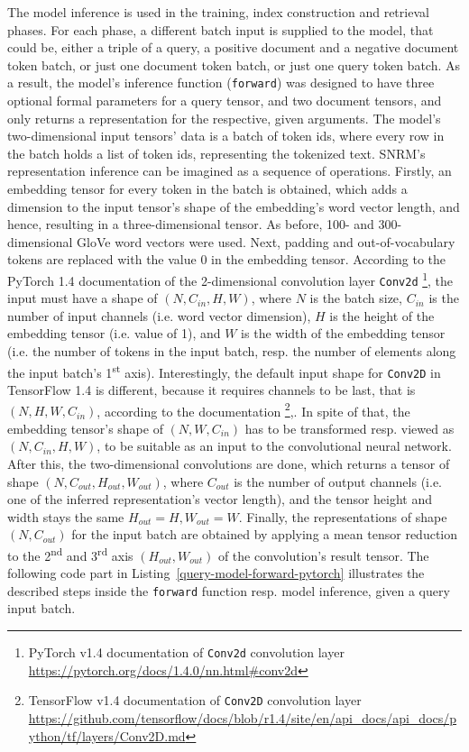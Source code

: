 The model inference is used in the training, index construction and retrieval phases.
For each phase, a different batch input is supplied to the model, that could be,
    either a triple of a query, a positive document and a negative document token batch,
    or just one document token batch, or just one query token batch.
As a result, the model's inference function (\texttt{forward}) was designed to have three optional formal parameters for
    a query tensor, and two document tensors, and only returns a representation for
    the respective, given arguments.
The model's two-dimensional input tensors' data is a batch of token ids, where every row in the batch 
    holds a list of token ids, representing the tokenized text.
SNRM's representation inference can be imagined as a sequence of operations.
Firstly, an embedding tensor for every token in the batch is obtained, which adds a dimension
    to the input tensor's shape of the embedding's word vector length, and hence, resulting 
    in a three-dimensional tensor.
As before, 100- and 300- dimensional GloVe word vectors were used.
Next, padding and out-of-vocabulary tokens are replaced with the value 0 in the embedding tensor.
According to the PyTorch 1.4 documentation of the 2-dimensional convolution layer \texttt{Conv2d}
    \footnote{PyTorch v1.4 documentation of \texttt{Conv2d} convolution layer \url{https://pytorch.org/docs/1.4.0/nn.html\#conv2d}},
    the input must have a shape of $(N, C_{in}, H, W)$, 
    where $N$ is the batch size,
    $C_{in}$ is the number of input channels (i.e. word vector dimension),
    $H$ is the height of the embedding tensor (i.e. value of 1), and 
    $W$ is the width of the embedding tensor (i.e. the number of tokens in the input batch, 
    resp. the number of elements along the input batch's 1\textsuperscript{st} axis).
Interestingly, the default input shape for \texttt{Conv2D} in TensorFlow 1.4 is different,
    because it requires channels to be last, that is $(N, H, W, C_{in})$,
    according to the documentation
    \footnote{TensorFlow v1.4 documentation of \texttt{Conv2D} convolution layer \url{https://github.com/tensorflow/docs/blob/r1.4/site/en/api_docs/api_docs/python/tf/layers/Conv2D.md}},.
In spite of that, the embedding tensor's shape of $(N, W, C_{in})$ has to be transformed resp. 
    viewed as $(N, C_{in}, H, W)$, to be suitable as an input to the convolutional neural network.
After this, the two-dimensional convolutions are done, which returns a tensor of shape 
    $(N, C_{out}, H_{out}, W_{out})$, where 
    $C_{out}$ is the number of output channels (i.e. one of the inferred representation's vector length),
    and the tensor height and width stays the same $H_{out} = H, W_{out} = W$.
Finally, the representations of shape $(N, C_{out})$ for the input batch are obtained by 
    applying a mean tensor reduction to the 2\textsuperscript{nd} and 3\textsuperscript{rd} axis $(H_{out}, W_{out})$
    of the convolution's result tensor.
The following code part in Listing~\ref{query-model-forward-pytorch} illustrates the described steps inside the \texttt{forward} function resp. model inference, 
    given a query input batch.

